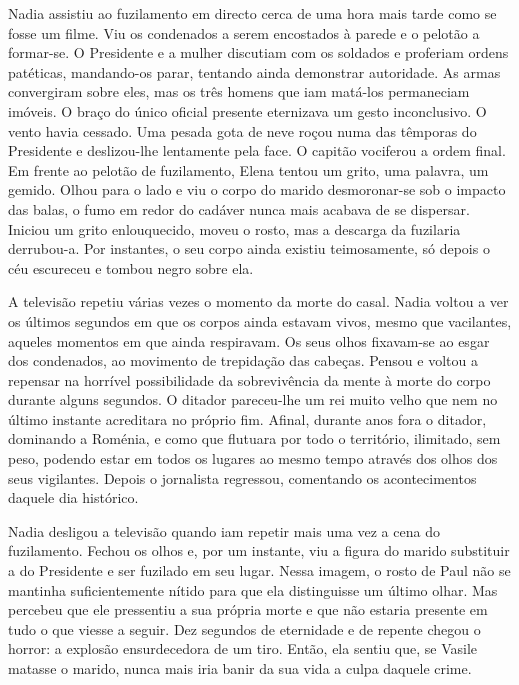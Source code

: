 Nadia assistiu ao fuzilamento em directo cerca de uma hora mais tarde
como se fosse um filme. Viu os condenados a serem encostados à parede
e o pelotão a formar-se. O Presidente e a mulher discutiam com os
soldados e proferiam ordens patéticas, mandando-os parar, tentando ainda
demonstrar autoridade. As armas convergiram sobre eles, mas os três
homens que iam matá-los permaneciam imóveis. O braço do único oficial
presente eternizava um gesto inconclusivo. O vento havia cessado. Uma
pesada gota de neve roçou numa das têmporas do Presidente e deslizou-lhe
lentamente pela face. O capitão vociferou a ordem final. Em frente ao
pelotão de fuzilamento, Elena tentou um grito, uma palavra, um gemido.
Olhou para o lado e viu o corpo do marido desmoronar-se sob o impacto
das balas, o fumo em redor do cadáver nunca mais acabava de se dispersar. Iniciou um grito enlouquecido, moveu o rosto, mas
a descarga da fuzilaria derrubou-a. Por instantes, o seu corpo ainda
existiu teimosamente, só depois o céu escureceu e tombou negro sobre
ela.

A televisão repetiu várias vezes o momento da morte do casal. Nadia
voltou a ver os últimos segundos em que os corpos ainda estavam vivos,
mesmo que vacilantes, aqueles momentos em que ainda respiravam. Os
seus olhos fixavam-se ao esgar dos condenados, ao movimento de
trepidação das cabeças. Pensou e voltou a repensar na horrível
possibilidade da sobrevivência da mente à morte do corpo durante alguns
segundos. O ditador pareceu-lhe um rei muito velho que nem no último
instante acreditara no próprio fim. Afinal, durante anos fora o ditador,
dominando a Roménia, e como que flutuara por todo o território,
ilimitado, sem peso, podendo estar em todos os lugares ao mesmo tempo
através dos olhos dos seus vigilantes. Depois o jornalista regressou,
comentando os acontecimentos daquele dia histórico.

Nadia desligou a televisão quando iam repetir mais uma
vez a cena do fuzilamento. Fechou os olhos e, por um instante, viu a
figura do marido substituir a do Presidente e ser fuzilado em seu lugar.
Nessa imagem, o rosto de Paul não se mantinha suficientemente nítido
para que ela distinguisse um último olhar. Mas percebeu que ele
pressentiu a sua própria morte e que não estaria presente em tudo o que
viesse a seguir. Dez segundos de eternidade e de repente chegou o
horror: a explosão ensurdecedora de um tiro. Então, ela sentiu que, se
Vasile matasse o marido, nunca mais iria banir da sua vida a culpa
daquele crime.

